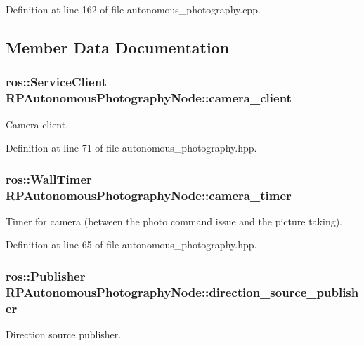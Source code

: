 \-Definition at line 162 of file autonomous\-\_\-photography.\-cpp.



\subsection{\-Member \-Data \-Documentation}
\hypertarget{class_r_p_autonomous_photography_node_aeb6c71c4b1f44d56d3ef4a523c33c677}{
\subsubsection[{camera\-\_\-client}]{\setlength{\rightskip}{0pt plus 5cm}ros\-::\-Service\-Client {\bf \-R\-P\-Autonomous\-Photography\-Node\-::camera\-\_\-client}}}\label{class_r_p_autonomous_photography_node_aeb6c71c4b1f44d56d3ef4a523c33c677}
\-Camera client. 

\-Definition at line 71 of file autonomous\-\_\-photography.\-hpp.

\hypertarget{class_r_p_autonomous_photography_node_abc5765930ab927f9046f77749c8c0e21}{
\subsubsection[{camera\-\_\-timer}]{\setlength{\rightskip}{0pt plus 5cm}ros\-::\-Wall\-Timer {\bf \-R\-P\-Autonomous\-Photography\-Node\-::camera\-\_\-timer}}}\label{class_r_p_autonomous_photography_node_abc5765930ab927f9046f77749c8c0e21}
\-Timer for camera (between the photo command issue and the picture taking). 

\-Definition at line 65 of file autonomous\-\_\-photography.\-hpp.

\hypertarget{class_r_p_autonomous_photography_node_afa3919a478867fdc881ca978e10a2e24}{
\subsubsection[{direction\-\_\-source\-\_\-publisher}]{\setlength{\rightskip}{0pt plus 5cm}ros\-::\-Publisher {\bf \-R\-P\-Autonomous\-Photography\-Node\-::direction\-\_\-source\-\_\-publisher}}}\label{class_r_p_autonomous_photography_node_afa3919a478867fdc881ca978e10a2e24}
\-Direction source publisher. 

